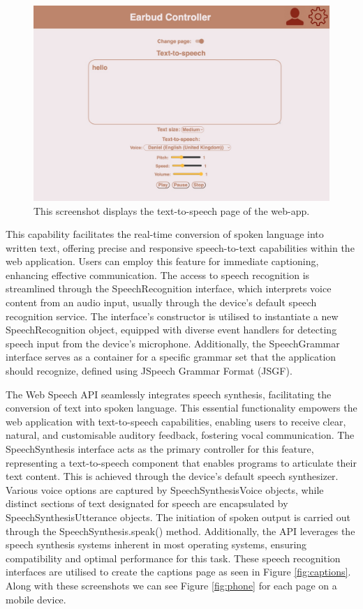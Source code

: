 \documentclass{l4proj}
\begin{document}
\begin{figure}
    \centering
    \includegraphics[width=0.85\linewidth]{dissertation/images/text-page.jpeg}   
    \caption{This screenshot displays the text-to-speech page of the web-app.}
    \label{fig:text-page} 
\end{figure}

This capability facilitates the real-time conversion of spoken language into written text, offering precise and responsive speech-to-text capabilities within the web application. Users can employ this feature for immediate captioning, enhancing effective communication. The access to speech recognition is streamlined through the SpeechRecognition interface, which interprets voice content from an audio input, usually through the device's default speech recognition service. The interface's constructor is utilised to instantiate a new SpeechRecognition object, equipped with diverse event handlers for detecting speech input from the device's microphone. Additionally, the SpeechGrammar interface serves as a container for a specific grammar set that the application should recognize, defined using JSpeech Grammar Format (JSGF).

The Web Speech API seamlessly integrates speech synthesis, facilitating the conversion of text into spoken language. This essential functionality empowers the web application with text-to-speech capabilities, enabling users to receive clear, natural, and customisable auditory feedback, fostering vocal communication. The SpeechSynthesis interface acts as the primary controller for this feature, representing a text-to-speech component that enables programs to articulate their text content. This is achieved through the device's default speech synthesizer. Various voice options are captured by SpeechSynthesisVoice objects, while distinct sections of text designated for speech are encapsulated by SpeechSynthesisUtterance objects. The initiation of spoken output is carried out through the SpeechSynthesis.speak() method. Additionally, the API leverages the speech synthesis systems inherent in most operating systems, ensuring compatibility and optimal performance for this task. These speech recognition interfaces are utilised to create the captions page as seen in Figure \ref{fig:captions}. Along with these screenshots we can see Figure \ref{fig:phone} for each page on a mobile device.
\end{document}
